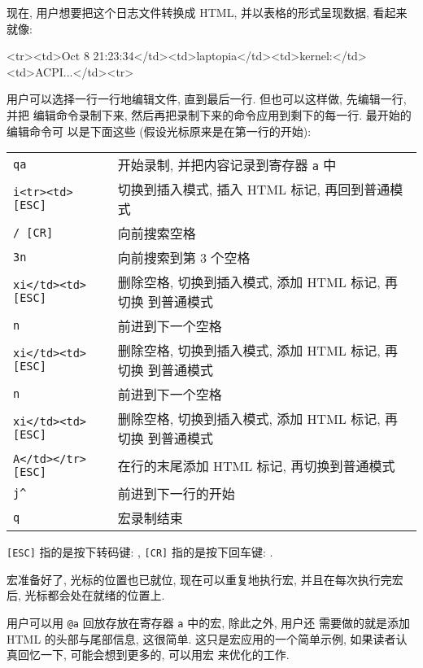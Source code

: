 现在, 用户想要把这个日志文件转换成 HTML, 并以表格的形式呈现数据, 看起来就像:
\begin{vimcode}
<tr><td>Oct 8 21:23:34</td><td>laptopia</td><td>kernel:</td><td>ACPI...</td><tr>
\end{vimcode}

用户可以选择一行一行地编辑文件, 直到最后一行. 但也可以这样做, 先编辑一行, 并把
编辑命令录制下来, 然后再把录制下来的命令应用到剩下的每一行. 最开始的编辑命令可
以是下面这些 (假设光标原来是在第一行的开始):
\begin{center}
    \begin{tabular}{ll}
    \hline
    \texttt{qa}             & 开始录制, 并把内容记录到寄存器 \texttt{a} 中 \\
    \texttt{i<tr><td>[ESC]} & 切换到插入模式, 插入 HTML 标记, 再回到普通模式 \\
    \texttt{/ [CR]}         & 向前搜索空格 \\
    \texttt{3n}             & 向前搜索到第 3 个空格 \\
    \texttt{xi</td><td>[ESC]}& 删除空格, 切换到插入模式, 添加 HTML 标记, 再切换
        到普通模式 \\
    \texttt{n}              & 前进到下一个空格 \\
    \texttt{xi</td><td>[ESC]}& 删除空格, 切换到插入模式, 添加 HTML 标记, 再切换
        到普通模式 \\
    \texttt{n}              & 前进到下一个空格 \\
    \texttt{xi</td><td>[ESC]}& 删除空格, 切换到插入模式, 添加 HTML 标记, 再切换
        到普通模式 \\
    \texttt{A</td></tr>[ESC]}&在行的末尾添加 HTML 标记, 再切换到普通模式 \\
    \texttt{j\^}            & 前进到下一行的开始 \\
    \texttt{q}              & 宏录制结束 \\
    \hline
\end{tabular}
\end{center}

\begin{warning}
    \texttt{[ESC]} 指的是按下转码键: , \texttt{[CR]} 指的是按下回车键:
    .
\end{warning}

宏准备好了, 光标的位置也已就位, 现在可以重复地执行宏, 并且在每次执行完宏后,
光标都会处在就绪的位置上.

用户可以用 \texttt{@a} 回放存放在寄存器 \texttt{a} 中的宏, 除此之外, 用户还
需要做的就是添加 HTML 的头部与尾部信息, 这很简单.
这只是宏应用的一个简单示例, 如果读者认真回忆一下, 可能会想到更多的, 可以用宏
来优化的工作.

